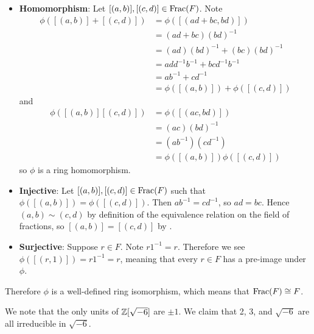 \begin{questions}
\begin{itemize}
        \item \textbf{Homomorphism}: Let $[(a,b)], [(c,d)] \in \mathrm{Frac}(F)$. Note
        \begin{align*}
            \phi([(a,b)] + [(c,d)]) &= \phi([(ad+bc, bd)])\\
            &= (ad+bc)(bd)^{-1}\\
            &= (ad)(bd)^{-1} + (bc)(bd)^{-1}\\
            &= add^{-1}b^{-1} + bcd^{-1}b^{-1}\\
            &= ab^{-1} + cd^{-1}\\
            &= \phi([(a,b)]) + \phi([(c,d)])
        \end{align*}
        and
        \begin{align*}
            \phi([(a,b)][(c,d)]) &= \phi([(ac,bd)])\\
            &= (ac)(bd)^{-1}\\
            &= (ab^{-1})(cd^{-1})\\
            &= \phi([(a,b)])\phi([(c,d)])
        \end{align*}
        so $\phi$ is a ring homomorphism.

        \item \textbf{Injective}: Let $[(a,b)], [(c,d)] \in \mathrm{Frac}(F)$ such that $\phi([(a,b)]) = \phi([(c,d)])$. Then $ab^{-1} = cd^{-1}$, so $ad = bc$. Hence $(a,b) \mathrel{\sim} (c,d)$ by definition of the equivalence relation on the field of fractions, so $[(a,b)] = [(c,d)]$ by .

        \item \textbf{Surjective}: Suppose $r \in F$. Note $r1^{-1} = r$. Therefore we see $\phi([(r, 1)]) = r1^{-1} = r$, meaning that every $r \in F$ has a pre-image under $\phi$.
    \end{itemize}
    Therefore $\phi$ is a well-defined ring isomorphism, which means that $\mathrm{Frac}(F) \cong F$.

    \item We note that the only units of $\mathbb{Z}[\sqrt{-6}]$ are $\pm1$. We claim that 2, 3, and $\sqrt{-6}$ are all irreducible in $\sqrt{-6}$.


\end{questions}

